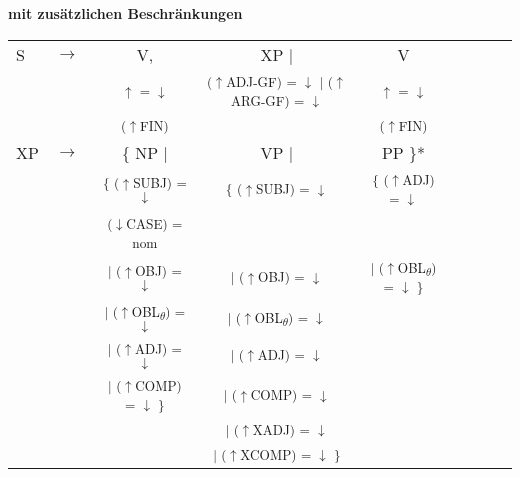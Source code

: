 \documentclass[12pt,a4paper]{article}
\begin{document}
\textbf{mit zusätzlichen Beschränkungen}
\begin{singlespace}
\begin{tabular}{ l  l  c  c  c  c  c  c  c}
S & $\rightarrow$ & V, & XP $\mid$ & V \\
   & $\qquad$ & \textsuperscript{$\uparrow$ = $\downarrow$} & \textsuperscript{($\uparrow$ADJ-GF) = $\downarrow$ $\mid$ ($\uparrow$ARG-GF) = $\downarrow$} &  \textsuperscript{$\uparrow$ = $\downarrow$} \\
      & $\qquad$ & \textsuperscript{($\uparrow$FIN)} & &  \textsuperscript{($\uparrow$FIN)}\\
XP & $\rightarrow$ & \{ NP $\mid$ &  VP $\mid$ & PP \}* \\
   & $\qquad$ & \textsuperscript{\{ ($\uparrow$SUBJ) = $\downarrow$} &\textsuperscript{\{ ($\uparrow$SUBJ) = $\downarrow$} & \textsuperscript{\{ ($\uparrow$ADJ) = $\downarrow$} \\
    & $\qquad$ & \textsuperscript{($\downarrow$CASE) = nom} & &  \\
    & $\qquad$ & \textsuperscript{$\mid$ ($\uparrow$OBJ) = $\downarrow$} & \textsuperscript{$\mid$ ($\uparrow$OBJ) = $\downarrow$} &  \textsuperscript{$\mid$ ($\uparrow$OBL\textsubscript{$\theta$}) = $\downarrow$ \}} \\
       & $\qquad$ & \textsuperscript{$\mid$ ($\uparrow$OBL\textsubscript{$\theta$}) = $\downarrow$} & \textsuperscript{$\mid$ ($\uparrow$OBL\textsubscript{$\theta$}) = $\downarrow$} & \\
         & $\qquad$ & \textsuperscript{$\mid$ ($\uparrow$ADJ) = $\downarrow$} & \textsuperscript{$\mid$ ($\uparrow$ADJ) = $\downarrow$} &  \\
           & $\qquad$ & \textsuperscript{$\mid$ ($\uparrow$COMP) = $\downarrow$ \}} & \textsuperscript{$\mid$ ($\uparrow$COMP) = $\downarrow$} &  \\
             & $\qquad$ & & \textsuperscript{$\mid$ ($\uparrow$XADJ) = $\downarrow$} &  \\
               & $\qquad$ & & \textsuperscript{$\mid$ ($\uparrow$XCOMP) = $\downarrow$ \} } &  \\

\end{tabular}
\end{singlespace}
\end{document}
